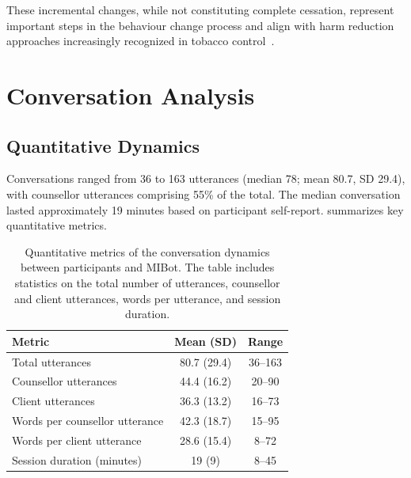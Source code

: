 These incremental changes, while not constituting complete cessation, represent important steps in the behaviour change process and align with harm reduction approaches increasingly recognized in tobacco control~\citep{Abrams2018}.

\section{Conversation Analysis}
\label{sec:conversation-analysis}

\subsection*{Quantitative Dynamics}
\label{sec:conversation-dynamics}

Conversations ranged from 36 to 163 utterances (median 78; mean 80.7, SD 29.4), with counsellor utterances comprising 55\% of the total. The median conversation lasted approximately 19 minutes based on participant self-report.  summarizes key quantitative metrics.

\begin{table}[ht]
	\centering
	\small
	\setlength{\tabcolsep}{4pt}
	\renewcommand{\arraystretch}{1.1}
	\begin{tabular}{@{}lcc@{}}
		\toprule
		\textbf{Metric}                & \textbf{Mean (SD)} & \textbf{Range} \\
		\midrule
		Total utterances               & 80.7 (29.4)        & 36--163        \\
		Counsellor utterances          & 44.4 (16.2)        & 20--90         \\
		Client utterances              & 36.3 (13.2)        & 16--73         \\
		Words per counsellor utterance & 42.3 (18.7)        & 15--95         \\
		Words per client utterance     & 28.6 (15.4)        & 8--72          \\
		Session duration (minutes)     & 19 (9)             & 8--45          \\
		\bottomrule
	\end{tabular}
	\caption[Conversation Dynamics between Participants and MIBot: Quantitative Metrics]{Quantitative metrics of the conversation dynamics between participants and MIBot. The table includes statistics on the total number of utterances, counsellor and client utterances, words per utterance, and session duration.}
	\label{table:conversation_metrics}
\end{table}

